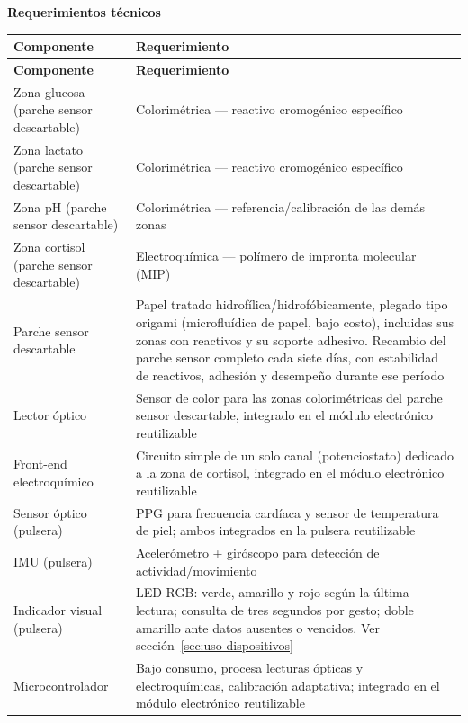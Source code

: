 \noindent\textbf{Requerimientos técnicos}
\par\medskip
{\small
\renewcommand{\arraystretch}{1.2}
\begin{xltabular}{\textwidth}{|>{\raggedright\arraybackslash}p{0.28\textwidth}|>{\raggedright\arraybackslash}X|}
\hline
\textbf{Componente} & \textbf{Requerimiento} \\
\hline
\endfirsthead
\hline
\textbf{Componente} & \textbf{Requerimiento} \\
\hline
\endhead
Zona glucosa (parche sensor descartable) & Colorimétrica --- reactivo cromogénico específico \\
\hline
Zona lactato (parche sensor descartable) & Colorimétrica --- reactivo cromogénico específico \\
\hline
Zona pH (parche sensor descartable) & Colorimétrica --- referencia/calibración de las demás zonas \\
\hline
Zona cortisol (parche sensor descartable) & Electroquímica --- polímero de impronta molecular (MIP) \\
\hline
Parche sensor descartable & Papel tratado hidrofílica/hidrofóbicamente, plegado tipo origami (microfluídica de papel, bajo costo), incluidas sus zonas con reactivos y su soporte adhesivo. Recambio del parche sensor completo cada siete días, con estabilidad de reactivos, adhesión y desempeño durante ese período \\
\hline
Lector óptico & Sensor de color para las zonas colorimétricas del parche sensor descartable, integrado en el módulo electrónico reutilizable \\
\hline
Front-end electroquímico & Circuito simple de un solo canal (potenciostato) dedicado a la zona de cortisol, integrado en el módulo electrónico reutilizable \\
\hline
Sensor óptico (pulsera) & PPG para frecuencia cardíaca y sensor de temperatura de piel; ambos integrados en la pulsera reutilizable \\
\hline
IMU (pulsera) & Acelerómetro + giróscopo para detección de actividad/movimiento \\
\hline
Indicador visual (pulsera) & LED RGB: verde, amarillo y rojo según la última lectura; consulta de tres segundos por gesto; doble amarillo ante datos ausentes o vencidos. Ver sección~\ref{sec:uso-dispositivos}\\
\hline
Microcontrolador & Bajo consumo, procesa lecturas ópticas y electroquímicas, calibración adaptativa; integrado en el módulo electrónico reutilizable \\

\end{xltabular}}
